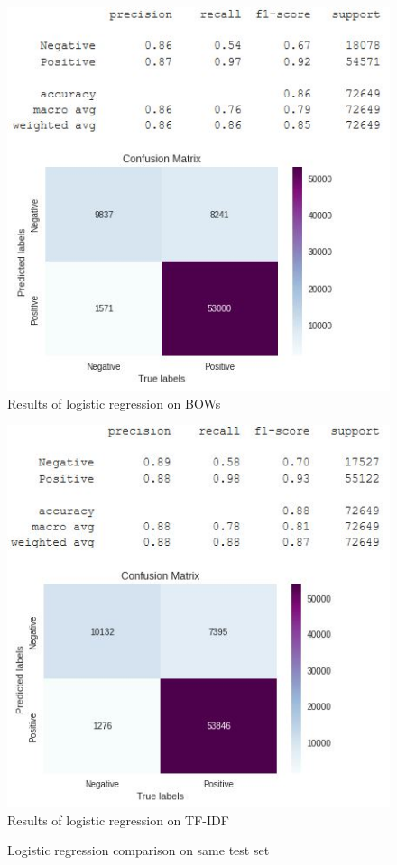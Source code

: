 \documentclass[11pt]{article}
\begin{document}
\begin{figure}[H]
	\begin{minipage}[b]{0.48\textwidth}
		\centering
		\includegraphics[width=\textwidth]{logreg_bow.JPG}
		{Results of logistic regression on BOWs}
	\end{minipage}
	\hfill
	\begin{minipage}[b]{0.48\textwidth}
		\centering
		\includegraphics[width=\textwidth]{logreg_tfidf.JPG}
		{Results of logistic regression on TF-IDF}
	\end{minipage}
	\caption{Logistic regression comparison on same test set}
	\label{logreg_fig}
\end{figure}
\end{document}

